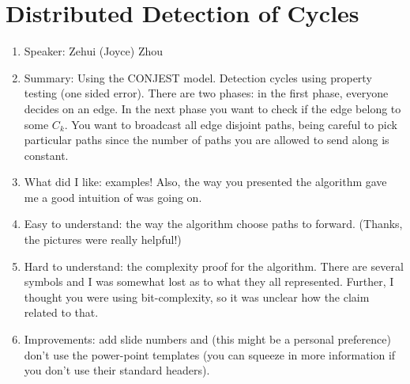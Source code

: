 \documentclass[twoside]{article}
\begin{document}
\section{Distributed Detection of Cycles}
\begin{enumerate}
\item Speaker: Zehui (Joyce) Zhou
\item Summary: Using the CONJEST model. Detection cycles using property testing (one sided error). There are two phases: in the first phase, everyone decides on an edge. In the next phase you want to check if the edge belong to some $C_k$. You want to broadcast all edge disjoint paths, being careful to pick particular paths since the number of paths you are allowed to send along is constant. 
\item What did I like: examples! Also, the way you presented the algorithm gave me a good intuition of was going on.
\item Easy to understand: the way the algorithm choose paths to forward. (Thanks, the pictures were really helpful!)
\item Hard to understand: the complexity proof for the algorithm. There are several symbols and I was somewhat lost as to what they all represented. Further, I thought you were using bit-complexity, so it was unclear how the claim related to that.
\item Improvements: add slide numbers and (this might be a personal preference) don't use the power-point templates (you can squeeze in more information if you don't use their standard headers).
\end{enumerate}
\end{document}
